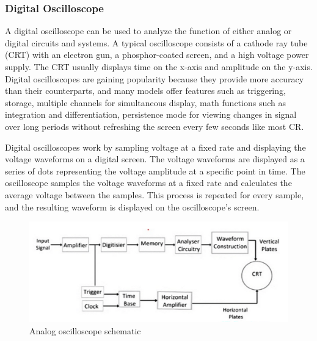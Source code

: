 \subsubsection*{Digital Oscilloscope}
A digital oscilloscope can be used to analyze the function of either analog or digital circuits and systems. A typical oscilloscope consists of a cathode ray tube (CRT) with an electron gun, a phosphor-coated screen, and a high voltage power supply. The CRT usually displays time on the x-axis and amplitude on the y-axis. Digital oscilloscopes are gaining popularity because they provide more accuracy than their counterparts, and many models offer features such as triggering, storage, multiple channels for simultaneous display, math functions such as integration and differentiation, persistence mode for viewing changes in signal over long periods without refreshing the screen every few seconds like most CR.

Digital oscilloscopes work by sampling voltage at a fixed rate and displaying the voltage waveforms on a digital screen. The voltage waveforms are displayed as a series of dots representing the voltage amplitude at a specific point in time. The oscilloscope samples the voltage waveforms at a fixed rate and calculates the average voltage between the samples. This process is repeated for every sample, and the resulting waveform is displayed on the oscilloscope’s screen.

\begin{figure}[H]
	\centering
	\includegraphics[width=12cm]{images/img_1.png}
	\caption{Analog oscilloscope schematic}
	\label{fig:dunno-vol-2}
\end{figure}


















